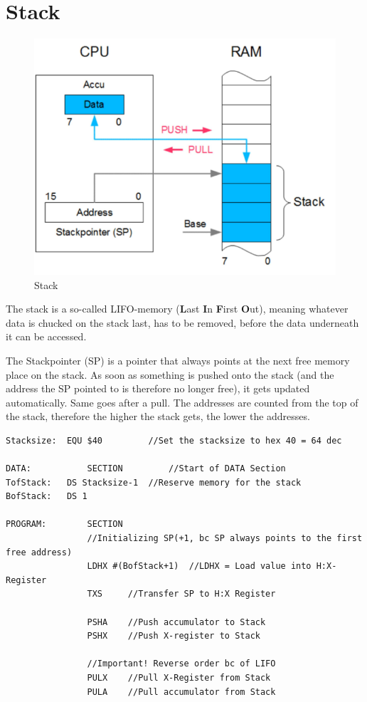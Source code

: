 \documentclass[a4paper, 11pt, nofootinbib]{book}
\begin{document}
\section{Stack}
\begin{figure}
	\centering
	\includegraphics[keepaspectratio=true,height=18\baselineskip]{stack.PNG}
	\caption{Stack}
	\label{fig:stack}
\end{figure}

The stack is a so-called LIFO-memory (\textbf{L}ast \textbf{I}n \textbf{F}irst \textbf{O}ut), meaning whatever data is chucked on the stack last, has to be removed, before the data underneath it can be accessed.
\vspace{10px}

\noindent The Stackpointer (SP) is a pointer that always points at the next free memory place on the stack. As soon as something is pushed onto the stack (and the address the SP pointed to is therefore no longer free), it gets updated automatically. Same goes after a pull. The addresses are counted from the top of the stack, therefore the higher the stack gets, the lower the addresses.

\newpage

\begin{lstlisting}[caption={Initialization of a stack}]
Stacksize:	EQU $40			//Set the stacksize to hex 40 = 64 dec

DATA:			SECTION			//Start of DATA Section	
TofStack:	DS Stacksize-1	//Reserve memory for the stack
BofStack:	DS 1

PROGRAM:		SECTION
				//Initializing SP(+1, bc SP always points to the first free address)
				LDHX #(BofStack+1)	//LDHX = Load value into H:X-Register
				TXS		//Transfer SP to H:X Register
			
				PSHA	//Push accumulator to Stack
				PSHX	//Push X-register to Stack
				
				//Important! Reverse order bc of LIFO
				PULX	//Pull X-Register from Stack
				PULA	//Pull accumulator from Stack
\end{lstlisting}
\end{document}

